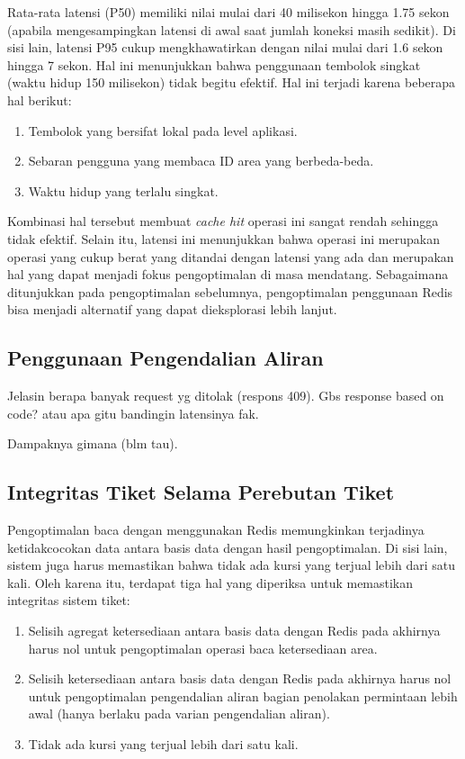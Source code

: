 Rata-rata latensi (P50) memiliki nilai mulai dari 40 milisekon hingga 1.75 sekon (apabila mengesampingkan latensi di awal saat jumlah koneksi masih sedikit). Di sisi lain, latensi P95 cukup mengkhawatirkan dengan nilai mulai dari 1.6 sekon hingga 7 sekon. Hal ini menunjukkan bahwa penggunaan tembolok singkat (waktu hidup 150 milisekon) tidak begitu efektif. Hal ini terjadi karena beberapa hal berikut:

\begin{enumerate}
    \item Tembolok yang bersifat lokal pada level aplikasi.
    \item Sebaran pengguna yang membaca ID area yang berbeda-beda.
    \item Waktu hidup yang terlalu singkat.
\end{enumerate}

Kombinasi hal tersebut membuat \textit{cache hit} operasi ini sangat rendah sehingga tidak efektif. Selain itu, latensi ini menunjukkan bahwa operasi ini merupakan operasi yang cukup berat yang ditandai dengan latensi yang ada dan merupakan hal yang dapat menjadi fokus pengoptimalan di masa mendatang. Sebagaimana ditunjukkan pada pengoptimalan sebelumnya, pengoptimalan penggunaan Redis bisa menjadi alternatif yang dapat dieksplorasi lebih lanjut.

\subsection{Penggunaan Pengendalian Aliran}

Jelasin berapa banyak request yg ditolak (respons 409). Gbs response based on code? atau apa gitu bandingin latensinya fak.

Dampaknya gimana (blm tau).

\subsection{Integritas Tiket Selama Perebutan Tiket}

Pengoptimalan baca dengan menggunakan Redis memungkinkan terjadinya ketidakcocokan data antara basis data dengan hasil pengoptimalan. Di sisi lain, sistem juga harus memastikan bahwa tidak ada kursi yang terjual lebih dari satu kali. Oleh karena itu, terdapat tiga hal yang diperiksa untuk memastikan integritas sistem tiket:

\begin{enumerate}
    \item Selisih agregat ketersediaan antara basis data dengan Redis pada akhirnya harus nol untuk pengoptimalan operasi baca ketersediaan area.
    \item Selisih ketersediaan antara basis data dengan Redis pada akhirnya harus nol untuk pengoptimalan pengendalian aliran bagian penolakan permintaan lebih awal (hanya berlaku pada varian pengendalian aliran).
    \item Tidak ada kursi yang terjual lebih dari satu kali.
\end{enumerate}

